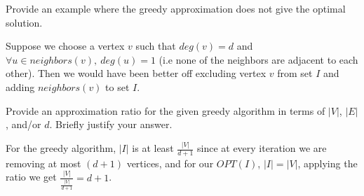 \documentclass[11pt]{article}
\begin{document}
\begin{subparts}
    \item Provide an example where the greedy approximation does not give the optimal solution.
    \begin{solution}
        Suppose we choose a vertex $v$ such that $deg(v)=d$ and $\forall u \in neighbors(v),~ deg(u)=1$ (i.e none of the neighbors are adjacent to each other). Then we would 
        have been better off excluding vertex $v$ from set $I$ and adding $neighbors(v)$ to set $I$.\\
        \begin{center}
        \end{center}
    \end{solution}
    \item Provide an approximation ratio for the given greedy algorithm in terms of $|V|$, $|E|$, and/or $d$. Briefly justify your answer. \\
    \begin{solution}
        For the greedy algorithm, $|I|$ is at least $\frac{|V|}{d+1}$ since at every iteration we are removing at most $(d + 1)$ vertices, and for our $OPT(I)$, $|I| = |V|$, applying the ratio
        we get $\frac{|V|}{\frac{|V|}{d+1}} = d + 1$.
    \end{solution}
\end{subparts}

\newpage
\end{document}
